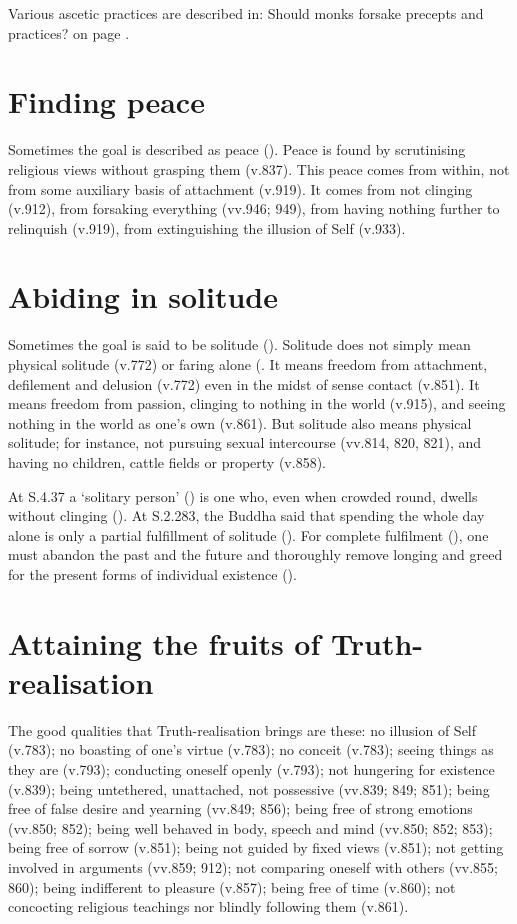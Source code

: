 Various ascetic practices are described in: Should monks forsake precepts and practices? on page \pageref{should-monks-forsake}.

\section*{Finding peace}

Sometimes the goal is described as peace (). Peace is found by scrutinising religious views without grasping them (v.837). This peace comes from within, not from some auxiliary basis of attachment (v.919). It comes from not clinging (v.912), from forsaking everything (vv.946; 949), from having nothing further to relinquish (v.919), from extinguishing the illusion of Self (v.933).

\section*{Abiding in solitude}\label{abiding-in-solitude}

Sometimes the goal is said to be solitude (). Solitude does not simply mean physical solitude (v.772) or faring alone (. It means freedom from attachment, defilement and delusion (v.772) even in the midst of sense contact (v.851). It means freedom from passion, clinging to nothing in the world (v.915), and seeing nothing in the world as one's own (v.861). But solitude also means physical solitude; for instance, not pursuing sexual intercourse (vv.814, 820, 821), and having no children, cattle fields or property (v.858).

At S.4.37 a `solitary person' () is one who, even when crowded round, dwells without clinging (). At S.2.283, the Buddha said that spending the whole day alone is only a partial fulfillment of solitude (). For complete fulfilment (), one must abandon the past and the future and thoroughly remove longing and greed for the present forms of individual existence ().

\section*{Attaining the fruits of Truth-realisation}

The good qualities that Truth-realisation brings are these: no illusion of Self (v.783); no boasting of one's virtue (v.783); no conceit (v.783); seeing things as they are (v.793); conducting oneself openly (v.793); not hungering for existence (v.839); being untethered, unattached, not possessive (vv.839; 849; 851); being free of false desire and yearning (vv.849; 856); being free of strong emotions (vv.850; 852); being well behaved in body, speech and mind (vv.850; 852; 853); being free of sorrow (v.851); being not guided by fixed views (v.851); not getting involved in arguments (vv.859; 912); not comparing oneself with others (vv.855; 860); being indifferent to pleasure (v.857); being free of time (v.860); not concocting religious teachings nor blindly following them (v.861).

